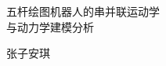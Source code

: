 \documentclass[UTF8,a4paper,zihao=-4,fontset=none]{ctexart}
\providecommand{\heiti}{\sffamily}
\begin{document}
\fontsize{12pt}{18pt}\selectfont

\setcounter{page}{1}
\begin{center}
{\heiti\fontsize{22pt}{29pt}\selectfont 五杆绘图机器人的串并联运动学\\与动力学建模分析\par}
\vspace{8pt}
{ 张子安琪\par}
\end{center}
\vspace{5pt}



\clearpage

\clearpage

\end{document}
